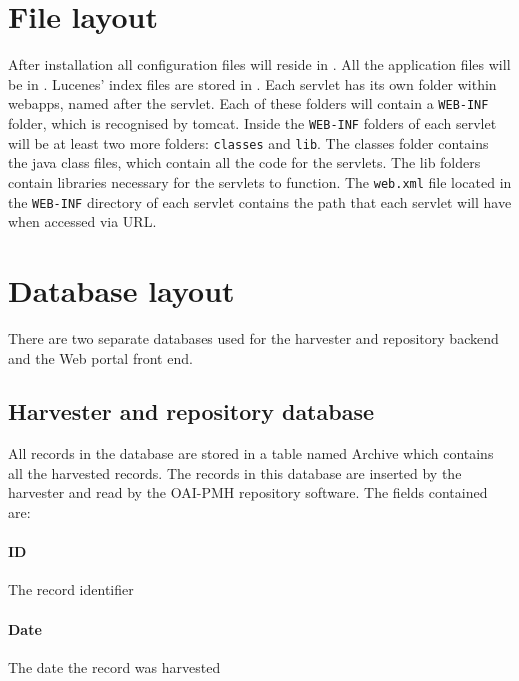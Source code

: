 \documentclass[a4paper,11pt]{article}
\begin{document}
\section{File layout}
\label{sec:file_layout}

After installation all configuration files will reside in . All the application files will be in . Lucenes' index files are stored in . Each servlet has its own folder within webapps, named after the servlet. Each of these folders will contain a \texttt{WEB-INF} folder, which is recognised by tomcat. Inside the \texttt{WEB-INF} folders of each servlet will be at least two more folders: \texttt{classes} and \texttt{lib}. The classes folder contains the java class files, which contain all the code for the servlets. The lib folders contain libraries necessary for the servlets to function. The \texttt{web.xml} file located in the \texttt{WEB-INF} directory of each servlet contains the path that each servlet will have when accessed via URL.

\section{Database layout}
\label{sec:database_layout}

There are two separate databases used for the harvester and repository backend and the Web portal front end.

\subsection{Harvester and repository database}
\label{sec:database_layout:harvester_and_repository_database}

All records in the database are stored in a table named Archive which contains all the harvested records. The records in this database are inserted by the harvester and read by the OAI-PMH repository software. The fields contained are: 

\paragraph{ID} 

The record identifier

\paragraph{Date} 

The date the record was harvested
\end{document}
